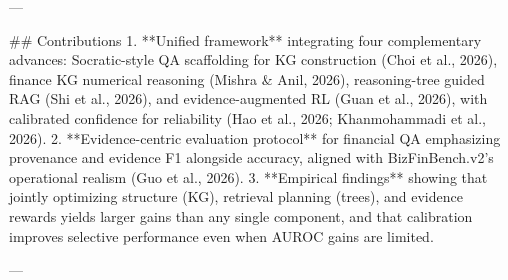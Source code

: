 ---

## Contributions  
1. **Unified framework** integrating four complementary advances: Socratic-style QA scaffolding for KG construction (Choi et al., 2026), finance KG numerical reasoning (Mishra & Anil, 2026), reasoning-tree guided RAG (Shi et al., 2026), and evidence-augmented RL (Guan et al., 2026), with calibrated confidence for reliability (Hao et al., 2026; Khanmohammadi et al., 2026).  
2. **Evidence-centric evaluation protocol** for financial QA emphasizing provenance and evidence F1 alongside accuracy, aligned with BizFinBench.v2’s operational realism (Guo et al., 2026).  
3. **Empirical findings** showing that jointly optimizing structure (KG), retrieval planning (trees), and evidence rewards yields larger gains than any single component, and that calibration improves selective performance even when AUROC gains are limited.

---